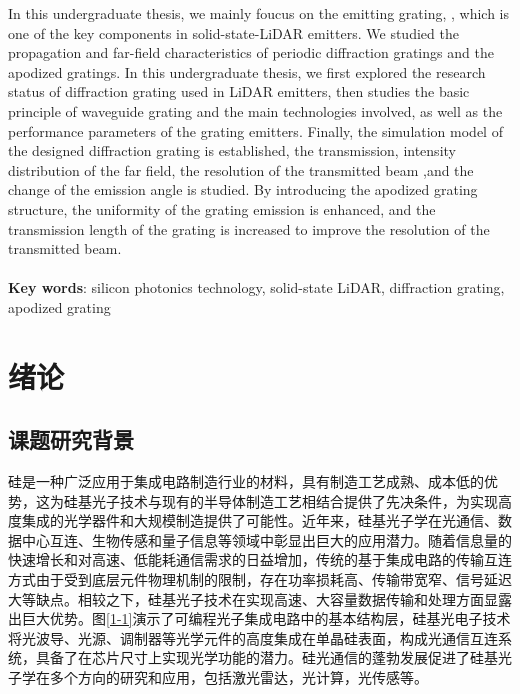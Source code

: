\documentclass[UTF8,a4paper,12pt]{ctexart}
\numberwithin{equation}{section}
\begin{document}
In this undergraduate thesis, we mainly foucus on the emitting grating,
, which is one of the key components in solid-state-LiDAR emitters. We studied the propagation and far-field characteristics of periodic diffraction gratings and the apodized gratings. In this undergraduate thesis, we first explored the research status of diffraction grating used in LiDAR emitters, then studies the basic principle of waveguide grating and the main technologies involved, as well as
the performance parameters of the grating emitters. Finally, the simulation model of the designed diffraction grating is established, the transmission, intensity distribution of the far field, the resolution of the transmitted beam ,and the change of the emission angle is studied.
By introducing the apodized grating structure, the uniformity of the grating emission is enhanced, and the transmission length of the grating is increased to improve the resolution of the transmitted beam.
\\
~\\ 
\textbf{Key words}: silicon photonics technology, solid-state LiDAR, diffraction grating, apodized grating

\newpage
\renewcommand\contentsname{\textbf{目\quad 录}}
\begin{center}
{\tableofcontents
\thispagestyle{fancy}
}
\end{center}

\newpage
{}
\section{绪论}
\subsection{课题研究背景}
硅是一种广泛应用于集成电路制造行业的材料，具有制造工艺成熟、成本低的优势，这为硅基光子技术与现有的半导体制造工艺相结合提供了先决条件，为实现高度集成的光学器件和大规模制造提供了可能性。近年来，硅基光子学在光通信、数据中心互连、生物传感和量子信息等领域中彰显出巨大的应用潜力。随着信息量的快速增长和对高速、低能耗通信需求的日益增加，传统的基于集成电路的传输互连方式由于受到底层元件物理机制的限制，存在功率损耗高、传输带宽窄、信号延迟大等缺点。相较之下，硅基光子技术在实现高速、大容量数据传输和处理方面显露出巨大优势。图\ref{1-1}演示了可编程光子集成电路中的基本结构层，硅基光电子技术将光波导、光源、调制器等光学元件的高度集成在单晶硅表面，构成光通信互连系统，具备了在芯片尺寸上实现光学功能的潜力。硅光通信的蓬勃发展促进了硅基光子学在多个方向的研究和应用，包括激光雷达，光计算，光传感等。
\end{document}
